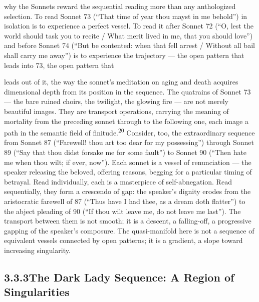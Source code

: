 why the Sonnets reward the sequential reading more than any anthologized selection. To read Sonnet 73 (“That time of year thou mayst in me behold”) in isolation is to experience a perfect vessel. To read it after Sonnet 72 (“O, lest the world should task you to recite / What merit lived in me, that you should love”) and before Sonnet 74 (“But be contented: when that fell arrest / Without all bail shall carry me away”) is to experience the trajectory — the open pattern that leads into 73, the open pattern that

leads out of it, the way the sonnet’s meditation on aging and death acquires dimensional depth from its position in the sequence. The quatrains of Sonnet 73 — the bare ruined choirs, the twilight, the glowing fire — are not merely beautiful images. They are transport operations, carrying the meaning of mortality from the preceding sonnet through to the following one, each image a path in the semantic field of finitude.\textsuperscript{20} Consider, too, the extraordinary sequence from Sonnet 87 (“Farewell! thou art too dear for my possessing”) through Sonnet 89 (“Say that thou didst forsake me for some fault”) to Sonnet 90 (“Then hate me when thou wilt; if ever, now”). Each sonnet is a vessel of renunciation — the speaker releasing the beloved, offering reasons, begging for a particular timing of betrayal. Read individually, each is a masterpiece of self-abnegation. Read sequentially, they form a crescendo of gap: the speaker’s dignity erodes from the aristocratic farewell of 87 (“Thus have I had thee, as a dream doth flatter”) to the abject pleading of 90 (“If thou wilt leave me, do not leave me last”). The transport between them is not smooth; it is a descent, a falling-off, a progressive gapping of the speaker’s composure. The quasi-manifold here is not a sequence of equivalent vessels connected by open patterns; it is a gradient, a slope toward increasing singularity.

\subsection{3.3.3\quad The Dark Lady Sequence: A Region of Singularities}

